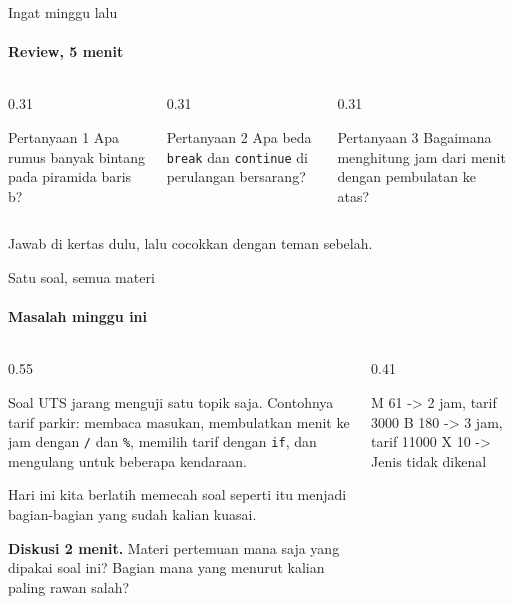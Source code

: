 \documentclass[t]{beamer}
\begin{document}
\begin{frame}{Ingat minggu lalu}
\framesubtitle{Review, 5 menit}
\begin{columns}[T]
\begin{column}{0.31\textwidth}
\begin{BlokGelap}{Pertanyaan 1}
Apa rumus banyak bintang pada piramida baris b?
\end{BlokGelap}
\end{column}
\begin{column}{0.31\textwidth}
\begin{BlokGelap}{Pertanyaan 2}
Apa beda \texttt{break} dan \texttt{continue} di perulangan bersarang?
\end{BlokGelap}
\end{column}
\begin{column}{0.31\textwidth}
\begin{BlokGelap}{Pertanyaan 3}
Bagaimana menghitung jam dari menit dengan pembulatan ke atas?
\end{BlokGelap}
\end{column}
\end{columns}
\vspace{8pt}
Jawab di kertas dulu, lalu cocokkan dengan teman sebelah.
\end{frame}


\begin{frame}[fragile]{Satu soal, semua materi}
\framesubtitle{Masalah minggu ini}
\begin{columns}[T]
\begin{column}{0.55\textwidth}
{\small Soal UTS jarang menguji satu topik saja. Contohnya tarif parkir: membaca masukan, membulatkan menit ke jam dengan \texttt{/} dan \texttt{\%}, memilih tarif dengan \texttt{if}, dan mengulang untuk beberapa kendaraan.

\vspace{6pt}
Hari ini kita berlatih memecah soal seperti itu menjadi bagian-bagian yang sudah kalian kuasai.\par}
\vspace{6pt}
\begin{Catatan}
\textbf{Diskusi 2 menit.} Materi pertemuan mana saja yang dipakai soal ini? Bagian mana yang menurut kalian paling rawan salah?
\end{Catatan}
\end{column}
\begin{column}{0.41\textwidth}
\begin{Keluaran}[]
M 61   -> 2 jam, tarif 3000
B 180  -> 3 jam, tarif 11000
X 10   -> Jenis tidak dikenal
\end{Keluaran}
\end{column}
\end{columns}
\end{frame}
\end{document}
